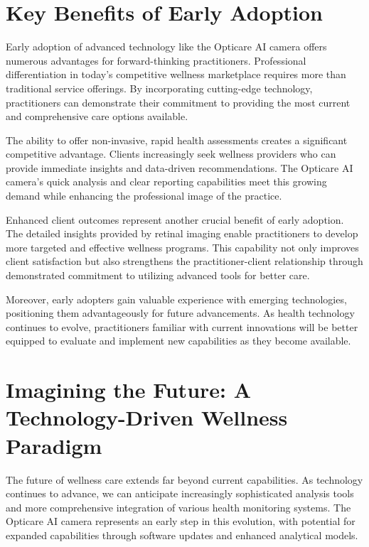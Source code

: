 \documentclass[
  Letterpaper,
]{scrbook}
\begin{document}
\section{Key Benefits of Early
Adoption}\label{key-benefits-of-early-adoption}

Early adoption of advanced technology like the Opticare AI camera offers
numerous advantages for forward-thinking practitioners. Professional
differentiation in today's competitive wellness marketplace requires
more than traditional service offerings. By incorporating cutting-edge
technology, practitioners can demonstrate their commitment to providing
the most current and comprehensive care options available.

The ability to offer non-invasive, rapid health assessments creates a
significant competitive advantage. Clients increasingly seek wellness
providers who can provide immediate insights and data-driven
recommendations. The Opticare AI camera's quick analysis and clear
reporting capabilities meet this growing demand while enhancing the
professional image of the practice.

Enhanced client outcomes represent another crucial benefit of early
adoption. The detailed insights provided by retinal imaging enable
practitioners to develop more targeted and effective wellness programs.
This capability not only improves client satisfaction but also
strengthens the practitioner-client relationship through demonstrated
commitment to utilizing advanced tools for better care.

Moreover, early adopters gain valuable experience with emerging
technologies, positioning them advantageously for future advancements.
As health technology continues to evolve, practitioners familiar with
current innovations will be better equipped to evaluate and implement
new capabilities as they become available.

\section{Imagining the Future: A Technology-Driven Wellness
Paradigm}\label{imagining-the-future-a-technology-driven-wellness-paradigm}

The future of wellness care extends far beyond current capabilities. As
technology continues to advance, we can anticipate increasingly
sophisticated analysis tools and more comprehensive integration of
various health monitoring systems. The Opticare AI camera represents an
early step in this evolution, with potential for expanded capabilities
through software updates and enhanced analytical models.
\end{document}
